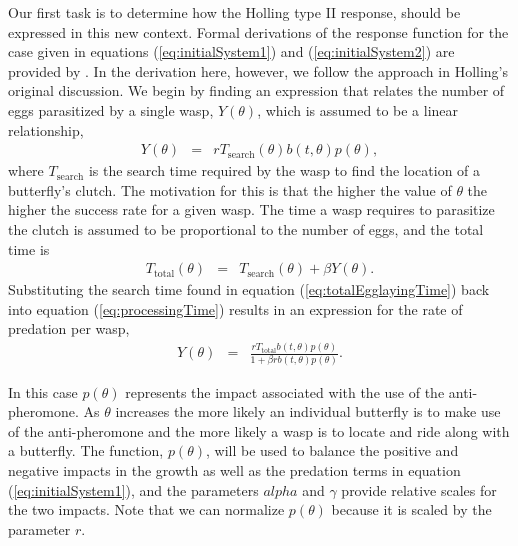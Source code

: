 \documentclass[review,authoryear]{elsarticle}
\def\alpha{alpha}%
\newcommand{\origB}{{b}}
\newcommand{\origAlpha}{{\alpha}}
\newcommand{\origGamma}{{\gamma}}
\newcommand{\origP}[1]{{p}(#1)}
\newcommand{\origTheta}{{\theta}}
\newcommand{\origT}{{t}}
\begin{document}
Our first task is to determine how the Holling type II response,
should be expressed in this new context. Formal derivations of the
response function for the case given in equations
(\ref{eq:initialSystem1}) and (\ref{eq:initialSystem2}) are provided
by \cite{DAWES201311}.  In the derivation here,
however, we follow the approach in Holling's original
discussion\citep{holling_1959A,holling_1959B}. We begin by finding an
expression that relates the number of eggs parasitized by a single
wasp, $Y(\origTheta)$, which is assumed to be a linear relationship,
\begin{eqnarray}
  \label{eq:processingTime}
  Y(\origTheta) & = & r T_{\mathrm{search}}(\origTheta) \origB(\origT,\origTheta) \origP{\origTheta},
\end{eqnarray}
where $T_{\mathrm{search}}$ is the search time required by the wasp to
find the location of a butterfly's clutch. The motivation for this is
that the higher the value of $\origTheta$ the higher the success rate for
a given wasp.  The time a wasp requires to parasitize the clutch is
assumed to be proportional to the number of eggs, and the total time
is
\begin{eqnarray}
  \label{eq:totalEgglayingTime}
  T_{\mathrm{total}}(\origTheta) & = & T_{\mathrm{search}}(\origTheta) + \beta Y(\origTheta).
\end{eqnarray}
Substituting the search time found in equation
(\ref{eq:totalEgglayingTime}) back into equation
(\ref{eq:processingTime}) results in an expression for the rate of
predation per wasp,
\begin{eqnarray}
  \label{eq:waspPredationRate}
  Y(\origTheta) & = & \frac{r T_{\mathrm{total}} \origB(\origT,\origTheta) \origP{\origTheta}}{1 + \beta r \origB(\origT,\origTheta) \origP{\origTheta}}.
\end{eqnarray}

In this case $\origP{\origTheta}$ represents the impact associated with the use
of the anti-pheromone. As $\origTheta$ increases the more likely an
individual butterfly is to make use of the anti-pheromone and the more
likely a wasp is to locate and ride along with a butterfly. The
function, $\origP{\origTheta}$, will be used to balance the positive and
negative impacts in the growth as well as the predation terms in
equation (\ref{eq:initialSystem1}), and the parameters $\origAlpha$ and
$\origGamma$ provide relative scales for the two impacts. Note that we can
normalize $\origP{\origTheta}$ because it is scaled by the parameter $r$.
\end{document}
